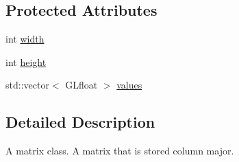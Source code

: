 \subsection*{\-Protected \-Attributes}
\begin{DoxyCompactItemize}
\item 
int \hyperlink{class_matrix_ad4320bd2dc03fd11887d3ba350c6c8ef}{width}
\item 
int \hyperlink{class_matrix_a0b5614256a04ece0ea54b8aad7e6980c}{height}
\item 
std\-::vector$<$ \-G\-Lfloat $>$ \hyperlink{class_matrix_a7b0bacf179e0b5ac7d5e74b7eff9e353}{values}
\end{DoxyCompactItemize}


\subsection{\-Detailed \-Description}
\-A matrix class. \-A matrix that is stored column major. 

